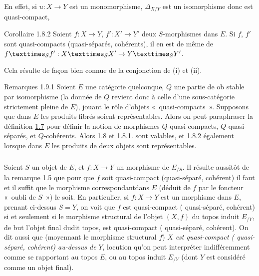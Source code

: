 \documentclass[10pt]{../fichiers-configuration-latex/smfart}
\begin{document}
En effet, si $u : X \to Y$ est un monomorphisme, $\Delta_{X/Y}$ est
un isomorphisme donc est quasi-compact, \cqfd

\begin{enonce*}{Corollaire 1.8.2}
Soient $f:X \to Y$, $f':X' \to Y'$ deux $S$-morphismes dans $E$. Si
$f$, $f'$ sont quasi-compacts (\resp quasi-séparés, \resp
cohérents), il en est de même de $\fprod{f}{f'}{S} : \fprod{X}{X'}{S} \to \fprod{Y}{Y'}{S}$.
\end{enonce*}

Cela résulte de façon bien connue de la conjonction de (i) et (ii).

\begin{enonce*}{Remarques 1.9.1}
Soient $E$ une catégorie quelconque, $Q$ une partie de ob stable par
isomorphisme (la donnée de $Q$ revient donc à celle d'une
sous-catégorie strictement pleine de $E$), jouant le rôle d'objets
« quasi-compacts ». Supposons que dans $E$ les produits fibrés
soient représentables. Alors on peut paraphraser la définition
\hyperref[VI.def1.7]{1.7} pour définir la notion de morphismes
$Q$-quasi-compacts, $Q$-quasi-séparés, et $Q$-cohérents. Alors
\hyperref[VI.prop1.8]{1.8} et \hyperref[VI.cor1.8.1]{1.8.1}. sont valables, et
\hyperref[VI.cor1.8.2]{1.8.2} également lorsque dans $E$ les produits de deux
objets sont représentables.
\end{enonce*}

\setcounter{subsection}{9}
\setcounter{subsubsection}{1}
\subsubsection{}
Soient $S$ un objet de $E$, et $f : X \to Y$ un morphisme de
$E_{/S}$. Il résulte aussitôt de la remarque 1.5 que pour que $f$
soit quasi-compact (\resp quasi-séparé, \resp cohérent) il faut et il
suffit que le morphisme correspondant\pageoriginale dans $E$ (déduit
de $f$ par le foncteur « oubli de $S$ ») le soit. En
particulier, si $f : X \to Y$ est un morphisme dans $E$, prenant
ci-dessus $S=Y$, on voit que $f$ est quasi-compact (\resp
quasi-séparé, \resp cohérent) si et seulement si
 le morphisme structural de l'objet $(X, f)$ du topos induit
$E_{/Y}$, de but l'objet final dudit topos, est quasi-compact (\resp
quasi-séparé, \resp cohérent). On dit aussi que (moyennant le
morphisme structural $f$) $X$ \emph{est quasi-compact (\emph{\resp}
  quasi-séparé, \emph{\resp} cohérent) au-dessus de} $Y$, locution qu'on peut
interpréter indifféremment comme se rapportant au topos $E$, ou au
topos induit $E_{/Y}$ (dont $Y$ est considéré comme un objet final).
\end{document}

